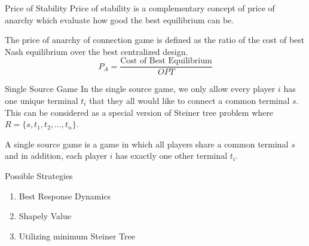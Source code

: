 \documentclass[11pt,aspectratio=169]{beamer}
\begin{document}
\begin{frame}{Price of Stability}
    Price of stability is a complementary concept of price of anarchy which evaluate how good the best equilibrium can be. 

\begin{definition} 
    The price of anarchy of connection game is defined as the ratio of the cost of best Nash equilibrium over the best centralized design.
    \[P_A = \frac{\text{Cost of Best Equilibrium}}{OPT}\]
    \end{definition}
\end{frame}

\begin{frame}{Single Source Game}
    In the single source game, we only allow every player \(i\) has one unique terminal \(t_i\) that they all would like to connect a common terminal \(s\). This can be considered as a special version of Steiner tree problem where \(R = \{s,t_1,t_2,...,t_n\}\). 
\vspace{10pt}
\begin{definition}
	A single source game is a game in which all players share a common terminal \(s\) and in addition, each player \(i\) has exactly one other terminal \(t_i\).
\end{definition}
\end{frame}

\begin{frame}{Possible Strategies}
    \begin{enumerate}
        \item Best Response Dynamics 
        \item Shapely Value 
        \item Utilizing minimum Steiner Tree
    \end{enumerate}
\end{frame}
\end{document}
